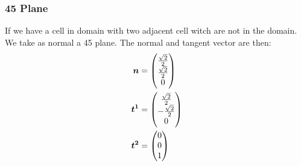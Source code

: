 \subsubsection{\unit{45}{\degree} Plane}

If we have a cell in domain with two adjacent cell witch are not in the domain.
We take as normal a \unit{45}{\degree} plane.
The normal and tangent vector are then:
\begin{align}
	{\boldsymbol {n}}&=\begin{pmatrix}
	\frac{\sqrt{2}}{2}\\
	\frac{\sqrt{2}}{2}\\
	0
	\end{pmatrix}\\
	{\boldsymbol {t^1}}&=\begin{pmatrix}
			\frac{\sqrt{2}}{2}\\
			-\frac{\sqrt{2}}{2}\\
			0
		\end{pmatrix}\\
		{\boldsymbol {t^2}}&=\begin{pmatrix}
			0\\
			0\\
			1
		\end{pmatrix}
\end{align}

